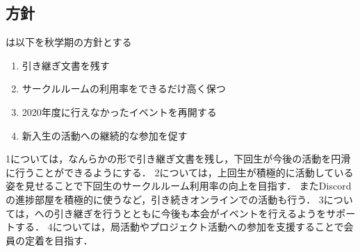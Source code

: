 \subsection*{\newGradeIfKouki{}\thirdGrade{}方針}


\thirdGrade{}は以下を秋学期の方針とする

\begin{enumerate}
    \item 引き継ぎ文書を残す
    \item サークルルームの利用率をできるだけ高く保つ
    \item 2020年度に行えなかったイベントを再開する
    \item 新入生の活動への継続的な参加を促す
\end{enumerate}

1については，なんらかの形で引き継ぎ文書を残し，下回生が今後の活動を円滑に行うことができるようにする．
2については，上回生が積極的に活動している姿を見せることで下回生のサークルルーム利用率の向上を目指す．
またDiscordの進捗部屋を積極的に使うなど，引き続きオンラインでの活動も行う．
3については，\secondGrade{}への引き継ぎを行うとともに今後も本会がイベントを行えるよう\secondGrade{}をサポートする．
4については，局活動やプロジェクト活動への参加を支援することで会員の定着を目指す．
